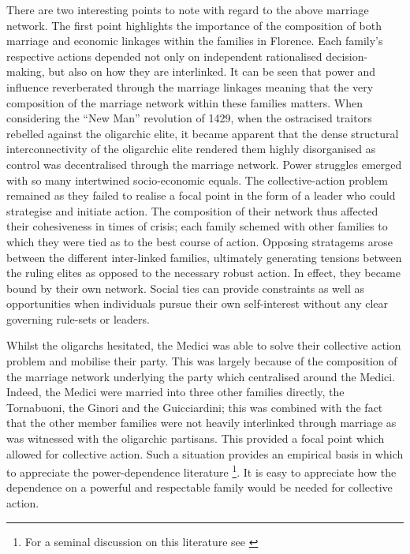 There are two interesting points to note with regard to the above marriage network. The first point highlights the importance of the composition of both marriage and economic linkages within the families in Florence. Each family's respective actions depended not only on independent rationalised decision-making, but also on how they are interlinked. It can be seen that power and influence reverberated through the marriage linkages meaning that the very composition of the marriage network within these families matters. When considering the ``New Man'' revolution of 1429, when the ostracised traitors rebelled against the oligarchic elite, it became apparent that the dense structural interconnectivity of the oligarchic elite rendered them highly disorganised as control was decentralised through the marriage network. Power struggles emerged with so many intertwined socio-economic equals. The collective-action problem remained as they failed to realise a focal point in the form of a leader who could strategise and initiate action. The composition of their network thus affected their cohesiveness in times of crisis; each family schemed with other families to which they were tied as to the best course of action. Opposing stratagems arose between the different inter-linked families, ultimately generating tensions between the ruling elites as opposed to the necessary robust action. In effect, they became bound by their own network. Social ties can provide constraints as well as opportunities when individuals pursue their own self-interest without any clear governing rule-sets or leaders.

Whilst the oligarchs hesitated, the Medici was able to solve their collective action problem and mobilise their party. This was largely because of the composition of the marriage network underlying the party which centralised around the Medici. Indeed, the Medici were married into three other families directly, the Tornabuoni, the Ginori and the Guicciardini; this was combined with the fact that the other member families were not heavily interlinked through marriage as was witnessed with the oligarchic partisans. This provided a focal point which allowed for collective action. Such a situation provides an empirical basis in which to appreciate the power-dependence literature \footnote{For a seminal discussion on this literature see \citet{Emerson1962}}. It is easy to appreciate how the dependence on a powerful and respectable family would be needed for collective action.

